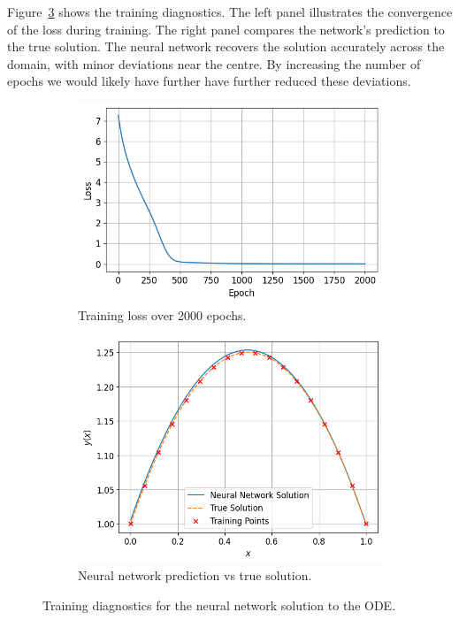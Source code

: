 Figure~\ref{fig:prelim_nn_diagnostics} shows the training diagnostics. The left panel illustrates the 
convergence of the loss during training. The right panel compares the network's prediction to the 
true solution. The neural network recovers the solution accurately across the domain, with minor 
deviations near the centre. By increasing the number of epochs we would likely have further have further 
reduced these deviations.

\begin{figure}[h]
    \centering
    \begin{subfigure}[t]{0.48\textwidth}
        \centering
        \includegraphics[width=\textwidth]{graphics/prelim_nn_loss_curve.png}
        \caption{Training loss over 2000 epochs.}
        \label{fig:prelim_nn_loss}
    \end{subfigure}
    \hfill
    \begin{subfigure}[t]{0.48\textwidth}
        \centering
        \includegraphics[width=\textwidth]{graphics/prelim_nn_example.png}
        \caption{Neural network prediction vs true solution.}
        \label{fig:prelim_nn_model}
    \end{subfigure}
    \caption{Training diagnostics for the neural network solution to the ODE.}
    \label{fig:prelim_nn_diagnostics}
\end{figure}
